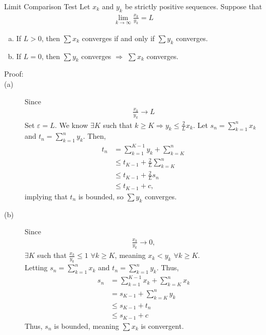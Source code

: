 \documentclass[10pt]{extarticle}
\begin{document}
  \begin{problem}{Limit Comparison Test}
    Let $x_k$ and $y_k$ be strictly positive sequences. Suppose that
    \begin{align*}
      \lim_{k\rightarrow\infty}\frac{x_k}{y_k} = L
    \end{align*}
    \begin{enumerate}[(a)]
      \item If $L > 0$, then $\sum x_k$ converges if and only if $\sum y_k$ converges.
      \item If $L = 0$, then $\sum y_k$ converges $ \Rightarrow$  $\sum x_k$ converges.
    \end{enumerate}
    \begin{description}
      \item[Proof:]\hfill
      \item[{\normalfont (a)}] Since
        \begin{align*}
          \frac{x_k}{y_k} \rightarrow L
        \end{align*}
        Set $\varepsilon = L$. We know $\exists K$ such that $k\geq K \Rightarrow y_k \leq \frac{2}{L}x_k$. Let $s_n = \sum_{k=1}^{n}x_k$ and $t_n = \sum_{k=1}^{n}y_k$. Then,
        \begin{align*}
          t_n &= \sum_{k=1}^{K-1}y_k + \sum_{k=K}^{n}\\
              &\leq t_{K-1} + \frac{2}{L} \sum_{k=K}^{n}\\
              &\leq t_{K-1} + \frac{2}{L} s_n\\
              &\leq t_{K-1} + c,
        \end{align*}
        implying that $t_n$ is bounded, so $\sum y_k$ converges.
      \item[{\normalfont (b)}] Since
        \begin{align*}
          \frac{x_k}{y_k} \rightarrow 0,
        \end{align*}
        $\exists K$ such that $\frac{x_k}{y_k} \leq 1$ $\forall k \geq K$, meaning $x_k < y_k$ $\forall k \geq K$.\\

        Letting $s_n = \sum_{k=1}^{n}x_k$ and $t_n = \sum_{k=1}^{n} y_k$. Thus,
        \begin{align*}
          s_n &= \sum_{k=1}^{K-1}x_k + \sum_{k=K}^{n} x_k\\
              &= s_{K-1} + \sum_{k=K}^{n}y_k\\
              &\leq s_{K-1} + t_n\\
              &\leq s_{K-1} + c
        \end{align*}
        Thus, $s_n$ is bounded, meaning $\sum x_k$ is convergent.
    \end{description}
  \end{problem}
\end{document}
